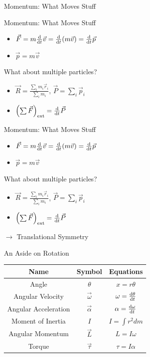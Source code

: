 \documentclass[10pt,xcolor={table,dvipsnames},t]{beamer}
\begin{document}
\begin{frame}{Momentum: What Moves Stuff}
    
\end{frame}

\begin{frame}{Momentum: What Moves Stuff}
    \begin{itemize}
        \item $\vec{F} = m \dv{t}\vec{v} = \dv{t} (m\vec{v}) = \dv{t}\vec{p}$
        \item $\vec{p} = m\vec{v}$
    \end{itemize}
    What about multiple particles?
    \begin{itemize}
        \item $\vec{R} = \frac{\sum_i m_i \vec{r}_i}{\sum_i m_i}$, $\vec{P} = \sum_i \vec{p}_i$
        \item $\left(\sum\vec{F}\right)_{\textrm{ext}} = \dv{t}\vec{P}$
    \end{itemize}
\end{frame}

\begin{frame}{Momentum: What Moves Stuff}
    \begin{itemize}
        \item $\vec{F} = m \dv{t}\vec{v} = \dv{t} (m\vec{v}) = \dv{t}\vec{p}$
        \item $\vec{p} = m\vec{v}$
    \end{itemize}
    What about multiple particles?
    \begin{itemize}
        \item $\vec{R} = \frac{\sum_i m_i \vec{r}_i}{\sum_i m_i}$, $\vec{P} = \sum_i \vec{p}_i$
        \item $\left(\sum\vec{F}\right)_{\textrm{ext}} = \dv{t}\vec{P}$
    \end{itemize}
    \vspace{20pt}
    $\to$ Translational Symmetry
    
\end{frame}

\begin{frame}{An Aside on Rotation}
    \begin{center}
        \begin{tabular}{|c|c|c|}
            \hline
            Name & Symbol & Equations \\
            \hline
            Angle & $\theta$ & $x = r\theta$ \\
            \hline
            Angular Velocity & $\vec{\omega}$ & $\omega = \dv{\theta}{t}$\\
            \hline
            Angular Acceleration & $\vec{\alpha}$ & $\alpha = \dv{\omega}{t}$ \\
            \hline
            Moment of Inertia & $I$ & $I = \int r^2 dm$\\
            \hline
            Angular Momentum & $\vec{L}$ & $L = I\omega$\\
            \hline
            Torque & $\vec{\tau}$ & $\tau = I\alpha$\\
            \hline
        \end{tabular}
    \end{center}
\end{frame}
\end{document}
